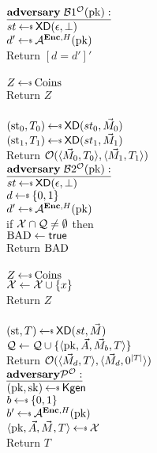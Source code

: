 \begin{figure}[tbhp]
\begin{center}
{
 {$\adversaryv{\;\advB1^{\mathcal{O}}(\pk)}$}\\
$st \getsr \mdalg(\epsilon,\bot)$\\
$d' \getsr \advA^{\encOracle,H}(\pk)$\\
Return $[d=d']'$\\ 

\\
  $Z \getsr \mathrm{Coins}$\\
  Return $Z$\\

\\
$(\st_0, \umd_0) \getsr \mdalg(st_0,\vmsg_0)$\\
$(\st_1, \umd_1) \getsr \mdalg(st_1,\vmsg_1)$\\
Return $\mathcal{O}(\langle \vec{M}_0,T_0\rangle, \langle \vec{M}_1,T_1\rangle)$\\
}
{
{$\adversaryv{\;\advB2^{\mathcal{O}}(\pk)}$}\\
$st \getsr \mdalg(\epsilon,\bot)$\\
$d \getsr \bits$\\ 
$d' \getsr \advA^{\encOracle,H}(\pk)$\\
if $\mathcal{X} \cap \mathcal{Q} \neq \emptyset$ then\\
\nudge $\mathrm{BAD}\gets\textsf{true}$\\
Return $\mathrm{BAD}$\\ 

\\
  $Z \getsr \mathrm{Coins}$\\
  $\mathcal{X} \gets \mathcal{X} \cup \{x\}$\\
  Return $Z$\\

\\
$(\st, \umd) \getsr \mdalg(st,\vmsg)$\\
$\mathcal{Q} \gets \mathcal{Q} \cup \{\langle \mathrm{pk},\vec{A},\vec{M}_b,T\rangle\}$\\
Return $\mathcal{O}(\langle \vec{M}_d,T\rangle, \langle \vec{M}_d,0^{|T|}\rangle)$\\
}
{
 $\adversaryv{\advP^{\mathcal{O}}}$\\
 $(\pk,\sk) \getsr \Kgen$\\
 $b \getsr \bits$\\
 $b' \getsr \advA^{\encOracle,H}(\pk)$\\
 $\langle \pk,\vad,\vmsg,T \rangle \getsr \cal X$\\
Return $T$\\ 

}
\end{center}
\end{figure}
